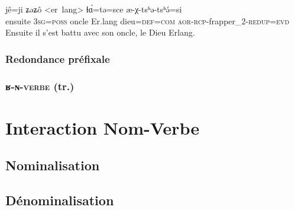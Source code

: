 \documentclass[11pt, a4paper]{book}              %
\newcommand{\ipa}[1]{{\phon \mbox{#1}}} %
\begin{document}
\begin{exe}
\ex \begin{xlist}

\ex 
\gll \ipa{æ̂ɕə} \ipa{jê=ji} \ipa{ʑəʑô} \ipa{<er lang>} \ipa{ɬɑ́=tə=sce} \ipa{æ-χ-tsʰə-tsʰə́=si}  \\
ensuite \textsc{3sg=poss} oncle Er.lang dieu=\textsc{def=com} \textsc{aor-rcp-}frapper_2-\textsc{redup=evd} \\
Ensuite il s'est battu avec son oncle, le Dieu Erlang. \\


\end{xlist}
\end{exe}

\section{Redondance préfixale}

\section{\ipa{ʁ-ɴ}-\textsc{verbe} (tr.)}


\part{Interaction Nom-Verbe}
\chapter{Nominalisation}
\chapter{Dénominalisation}
\end{document}
